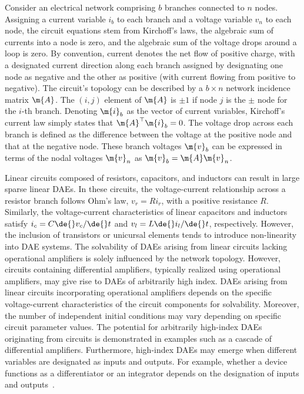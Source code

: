 Consider an electrical network comprising $b$ branches connected to $n$ nodes. Assigning a current variable $i_b$ to each branch and a voltage variable $v_n$ to each node, the circuit equations stem from Kirchoff's laws, \ie{} the algebraic sum of currents into a node is zero, and the algebraic sum of the voltage drops around a loop is zero. By convention, current denotes the net flow of positive charge, with a designated current direction along each branch assigned by designating one node as negative and the other as positive (with current flowing from positive to negative). The circuit's topology can be described by a $b \times n$ network incidence matrix $\m{A}$. The $(i,j)$ element of $\m{A}$ is $\pm1$ if node $j$ is the $\pm$ node for the $i$-th branch. Denoting $\m{i}_b$ as the vector of current variables, Kirchoff's current law simply states that $\m{A}^\top\m{i}_b = 0$. The voltage drop across each branch is defined as the difference between the voltage at the positive node and that at the negative node. These branch voltages $\m{v}_b$ can be expressed in terms of the nodal voltages $\m{v}_n$ as $\m{v}_b = \m{A}\m{v}_n$.

Linear circuits composed of resistors, capacitors, and inductors can result in large sparse linear \acp{DAE}. In these circuits, the voltage-current relationship across a resistor branch follows Ohm's law, $v_r = Ri_r$, with a positive resistance $R$. Similarly, the voltage-current characteristics of linear capacitors and inductors satisfy $i_c = C\de{}v_c/\de{}t$ and $v_l = L\de{}i_l/\de{}t$, respectively. However, the inclusion of transistors or unicursal elements tends to introduce non-linearity into \ac{DAE} systems. The solvability of \acp{DAE} arising from linear circuits lacking operational amplifiers is solely influenced by the network topology. However, circuits containing differential amplifiers, typically realized using operational amplifiers, may give rise to \acp{DAE} of arbitrarily high index. \acp{DAE} arising from linear circuits incorporating operational amplifiers depends on the specific voltage-current characteristics of the circuit components for solvability. Moreover, the number of independent initial conditions may vary depending on specific circuit parameter values. The potential for arbitrarily high-index \acp{DAE} originating from circuits is demonstrated in examples such as a cascade of differential amplifiers. Furthermore, high-index \acp{DAE} may emerge when different variables are designated as inputs and outputs. For example, whether a device functions as a differentiator or an integrator depends on the designation of inputs and outputs~\cite{brenan1995numerical}.

